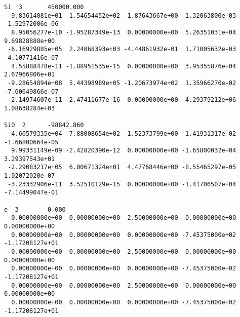 \begin{verbatim}
Si  3		450000.000							 
  9.83614081e+01  1.54654452e+02  1.87643667e+00  1.32063800e-03 -1.52972006e-06
  8.95056277e-10 -1.95287349e-13  0.00000000e+00  5.26351031e+04  9.69828888e+00
 -6.16929885e+05  2.24068393e+03 -4.44861932e-01  1.71005632e-03 -4.10771416e-07
  4.55888478e-11 -1.88951535e-15  0.00000000e+00  3.95355876e+04  2.67966806e+01
 -9.28654894e+08  5.44398989e+05 -1.20673974e+02  1.35966270e-02 -7.60649866e-07
  2.14974607e-11 -2.47411677e-16  0.00000000e+00 -4.29379212e+06  1.08638284e+03
										 
SiO  2		-98842.860						         
 -4.60579335e+04  7.88008654e+02 -1.52373799e+00  1.41931317e-02 -1.66800664e-05
  9.99331149e-09 -2.42820390e-12  0.00000000e+00 -1.65800032e+04  3.29397543e+01
 -2.29083217e+05  6.00671324e+01  4.47768446e+00 -8.55465297e-05  1.02072020e-07
 -3.23332906e-11  3.52510129e-15  0.00000000e+00 -1.41706507e+04 -7.14499047e-01
										 
e  3		0.000								 
  0.00000000e+00  0.00000000e+00  2.50000000e+00  0.00000000e+00  0.00000000e+00
  0.00000000e+00  0.00000000e+00  0.00000000e+00 -7.45375000e+02 -1.17208127e+01
  0.00000000e+00  0.00000000e+00  2.50000000e+00  0.00000000e+00  0.00000000e+00
  0.00000000e+00  0.00000000e+00  0.00000000e+00 -7.45375000e+02 -1.17208127e+01
  0.00000000e+00  0.00000000e+00  2.50000000e+00  0.00000000e+00  0.00000000e+00
  0.00000000e+00  0.00000000e+00  0.00000000e+00 -7.45375000e+02 -1.17208127e+01
\end{verbatim}
\nolinenumbers
